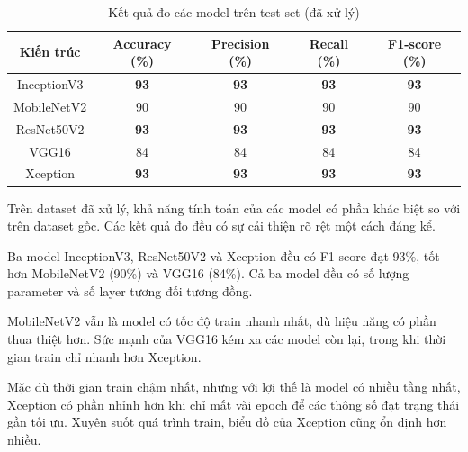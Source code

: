 \documentclass[a4paper,14pt]{extarticle}
\begin{document}
		\begin{table}[H]
			\centering
			\begin{tabular}{|c|c|c|c|c|}
				\hline
				Kiến trúc   & Accuracy (\%) & Precision (\%) & Recall (\%) & F1-score (\%)    \\ \hline
				InceptionV3 & \textbf{93}   & \textbf{93}    & \textbf{93} & \textbf{93} \\
				MobileNetV2 & 90            & 90             & 90          & 90          \\
				ResNet50V2  & \textbf{93}   & \textbf{93}    & \textbf{93} & \textbf{93} \\
				VGG16       & 84            & 84             & 84          & 84          \\
				Xception    & \textbf{93}   & \textbf{93}    & \textbf{93} & \textbf{93} \\ \hline
			\end{tabular}
			\caption{Kết quả đo các model trên test set (đã xử lý)}
		\end{table}
		
		Trên dataset đã xử lý, khả năng tính toán của các model có phần khác biệt so với trên dataset gốc. Các kết quả đo đều có sự cải thiện rõ rệt một cách đáng kể.

		Ba model InceptionV3, ResNet50V2 và Xception đều có F1-score đạt 93\%, tốt hơn MobileNetV2 (90\%) và VGG16 (84\%). Cả ba model đều có số lượng parameter và số layer tương đối tương đồng.
		
		MobileNetV2 vẫn là model có tốc độ train nhanh nhất, dù hiệu năng có phần thua thiệt hơn. Sức mạnh của VGG16 kém xa các model còn lại, trong khi thời gian train chỉ nhanh hơn Xception.

		Mặc dù thời gian train chậm nhất, nhưng với lợi thế là model có nhiều tầng nhất, Xception có phần nhỉnh hơn khi chỉ mất vài epoch để các thông số đạt trạng thái gần tối ưu. Xuyên suốt quá trình train, biểu đồ của Xception cũng ổn định hơn nhiều.
\end{document}
